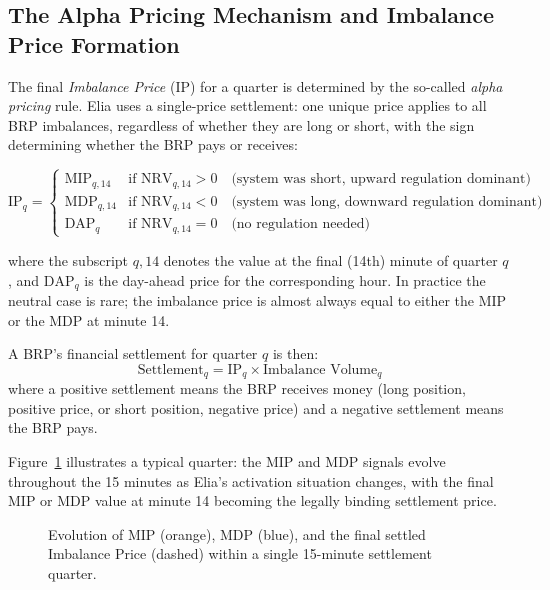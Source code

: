 \subsection{The Alpha Pricing Mechanism and Imbalance Price Formation}
\label{sec:alpha-pricing}

The final \textit{Imbalance Price} (IP) for a quarter is determined by the so-called \textit{alpha pricing} rule. Elia uses a single-price settlement: one unique price applies to all BRP imbalances, regardless of whether they are long or short, with the sign determining whether the BRP pays or receives:

\[
    \text{IP}_q =
    \begin{cases}
        \text{MIP}_{q,14} & \text{if } \text{NRV}_{q,14} > 0 \quad \text{(system was short, upward regulation dominant)} \\
        \text{MDP}_{q,14} & \text{if } \text{NRV}_{q,14} < 0 \quad \text{(system was long, downward regulation dominant)} \\
        \text{DAP}_q       & \text{if } \text{NRV}_{q,14} = 0 \quad \text{(no regulation needed)}
    \end{cases}
\]

where the subscript $q,14$ denotes the value at the final (14th) minute of quarter $q$, and $\text{DAP}_q$ is the day-ahead price for the corresponding hour. In practice the neutral case is rare; the imbalance price is almost always equal to either the MIP or the MDP at minute 14.

A BRP's financial settlement for quarter $q$ is then:
\[
    \text{Settlement}_q = \text{IP}_q \times \text{Imbalance Volume}_q
\]
where a positive settlement means the BRP receives money (long position, positive price, or short position, negative price) and a negative settlement means the BRP pays.

Figure~\ref{fig:mip-mdp-ip} illustrates a typical quarter: the MIP and MDP signals evolve throughout the 15 minutes as Elia's activation situation changes, with the final MIP or MDP value at minute 14 becoming the legally binding settlement price.

\begin{figure}[h]
    \centering
    \caption{Evolution of MIP (orange), MDP (blue), and the final settled Imbalance Price (dashed) within a single 15-minute settlement quarter.}
    \label{fig:mip-mdp-ip}
\end{figure}

